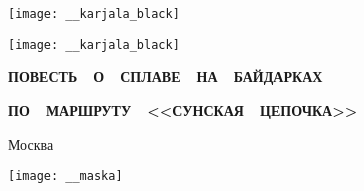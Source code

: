 \begin{titlepage}
	\newpage
	\begin{center}
		\Large \textbf \MyVarAuthorName
	\end{center}	
	\vspace{0.75cm}	
	\begin{center}
 	\texttt{[image: \_\_karjala\_black]}
	\end{center}	
	\begin{center}
		\Huge{}
	\end{center}	
%
	\begin{center}
	\texttt{[image: \_\_karjala\_black]}
	\end{center}
%
	\begin{center}
		\footnotesize
%	
		{
		\textbf{ПОВЕСТЬ~~О~~СПЛАВЕ~~НА~~БАЙДАРКАХ}}
		
		{
		\textbf{ПО~~МАРШРУТУ~~<<СУНСКАЯ~~ЦЕПОЧКА>>}}		
	\end{center}
%
	\vspace{\fill}	
	\begin{center}\normalsize Москва\end{center}
	\vspace{-1.1cm}
	\begin{center}\texttt{[image: \_\_maska]}\end{center}
	\vspace{-1.24cm}
	\begin{center}\normalsize \year\end{center}		
	\begin{flushleft}%
		\textbf{%
		}
	\end{flushleft}%
\end{titlepage}
